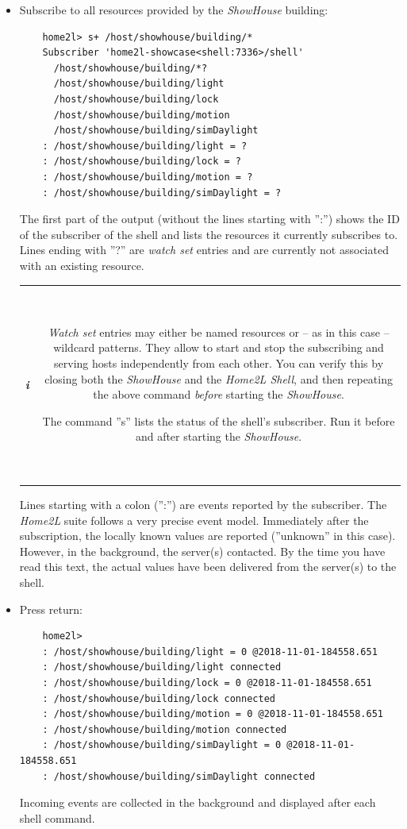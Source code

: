 \documentclass[12pt,english,parskip=half]{scrreprt}
\newcommand{\infobox}[1]{
  \hfill
  \setlength\arrayrulewidth{1pt}
  \begin{tabular}[t]{c|c|}
    \parbox{1.8em}{\hfill\textit{\Huge\textbf{i}\,}}
    &
    \,\parbox{0.89\linewidth}{\setlength{\parskip}{0.5em}#1}\,
  \end{tabular}
  \par
}
\begin{document}
\begin{itemize}[$\blacktriangleright$]
\item
  Subscribe to all resources provided by the \emph{ShowHouse} building:
  \begin{lstlisting}
    home2l> s+ /host/showhouse/building/*
    Subscriber 'home2l-showcase<shell:7336>/shell'
      /host/showhouse/building/*?
      /host/showhouse/building/light
      /host/showhouse/building/lock
      /host/showhouse/building/motion
      /host/showhouse/building/simDaylight
    : /host/showhouse/building/light = ?
    : /host/showhouse/building/lock = ?
    : /host/showhouse/building/motion = ?
    : /host/showhouse/building/simDaylight = ?
  \end{lstlisting}
  The first part of the output (without the lines starting with '':'')
  shows the ID of the subscriber of the shell and lists the resources it
  currently subscribes to. Lines ending with ''?'' are \emph{watch set}
  entries and are currently not associated with an existing resource.

  \infobox{
    \emph{Watch set} entries may either be named resources or -- as in this case -- wildcard
    patterns. They allow to start and stop the subscribing and serving hosts independently
    from each other. You can verify this by closing both the \emph{ShowHouse} and the \emph{Home2L Shell},
    and then repeating the above command \emph{before} starting the \emph{ShowHouse}.

    The command ''s'' lists the status of the shell's subscriber. Run it before and after starting
    the \emph{ShowHouse}.
  }

  Lines starting with a colon ('':'') are events reported by the
  subscriber. The \emph{Home2L} suite follows a very precise event model.
  Immediately after the subscription, the locally known values are
  reported (''unknown'' in this case). However, in the background,
  the server(s) contacted. By the time you have read this text,
  the actual values have been delivered from the server(s) to the shell.

\item
  Press return:
  \begin{lstlisting}
    home2l>
    : /host/showhouse/building/light = 0 @2018-11-01-184558.651
    : /host/showhouse/building/light connected
    : /host/showhouse/building/lock = 0 @2018-11-01-184558.651
    : /host/showhouse/building/lock connected
    : /host/showhouse/building/motion = 0 @2018-11-01-184558.651
    : /host/showhouse/building/motion connected
    : /host/showhouse/building/simDaylight = 0 @2018-11-01-184558.651
    : /host/showhouse/building/simDaylight connected
  \end{lstlisting}
  Incoming events are collected in the background and displayed after each shell command.


\end{itemize}
\end{document}
